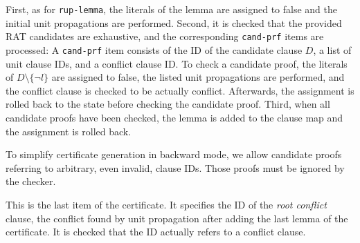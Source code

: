 \documentclass{llncs}
\newcommand{\lsti}{\lstinline[language={},literate={}]}
\begin{document}
\begin{description}
      First, as for \lsti{rup-lemma}, the literals of the lemma are assigned to false and the initial unit propagations are performed. 
      Second, it is checked that the provided RAT candidates are exhaustive, and the corresponding \lsti{cand-prf} items are processed:
      A \lsti{cand-prf} item consists of the ID of the candidate clause $D$, a list of unit clause IDs, and a conflict clause ID.
      To check a candidate proof, the literals of $D\setminus\{\neg l\}$ are assigned to false, the listed unit propagations are performed, and the conflict clause is 
      checked to be actually conflict. Afterwards, the assignment is rolled back to the state before checking the candidate proof.
      Third, when all candidate proofs have been checked, the lemma is added to the clause map and the assignment is rolled back.

      To simplify certificate generation in backward mode, we allow candidate proofs referring to arbitrary, even invalid, clause IDs. Those proofs must be ignored by the checker.
    \item[conflict] This is the last item of the certificate. It specifies the ID of the \emph{root conflict} clause, \ie the conflict found by unit propagation after adding the last 
    lemma of the certificate. It is checked that the ID actually refers to a conflict clause.
\end{description}
\end{document}
